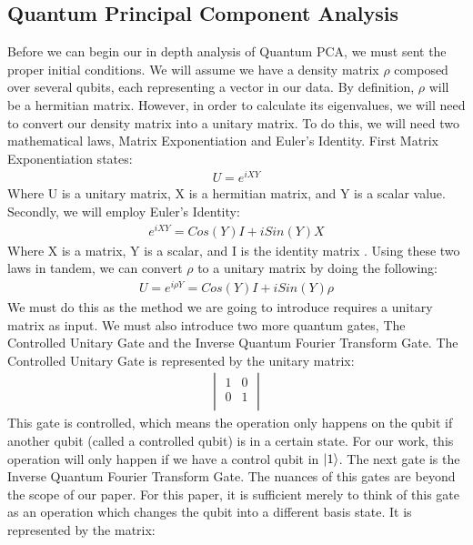 \documentclass[conference]{IEEEtran}
\begin{document}
\subsection{Quantum Principal Component Analysis}
Before we can begin our in depth analysis of Quantum PCA, we must sent the proper initial conditions. We will assume we have a density matrix $\rho$ composed over several qubits, each representing a vector in our data. By definition, $\rho$ will be a hermitian matrix. However, in order to calculate its eigenvalues, we will need to convert our density matrix into a unitary matrix. To do this, we will need two mathematical laws, Matrix Exponentiation and Euler's Identity. First Matrix Exponentiation states:    
\begin{align*}
U = e^{iXY}
\end{align*} 
Where U is a unitary matrix, X is a hermitian matrix, and Y is a scalar value. Secondly, we will employ Euler's Identity: 
\begin{align*}
e^{iXY} = Cos(Y)I + iSin(Y)X
\end{align*} 
Where X is a matrix, Y is a scalar, and I is the identity matrix \cite{b16}. Using these two laws in tandem, we can convert $\rho$ to a unitary matrix by doing the following:
\begin{align*}
 U = e^{i\rho Y} = Cos(Y)I + iSin(Y)\rho
\end{align*} 
We must do this as the method we are going to introduce requires a unitary matrix as input. We must also introduce two more quantum gates, The Controlled Unitary Gate and the Inverse Quantum Fourier Transform Gate. The Controlled Unitary Gate is represented by the unitary matrix: 
 \begin{align*}
    \begin{vmatrix}
    1 & 0 \\
    0 & 1  \\
    \end{vmatrix}
 \end{align*}  
This gate is controlled, which means the operation only happens on the qubit if another qubit (called a controlled qubit) is in a certain state. For our work, this operation will only happen if we have a control qubit in $\ket{1}$.  
\newline
\indent The next gate is the Inverse Quantum Fourier Transform Gate. The nuances of this gates are beyond the scope of our paper. For this paper, it is sufficient merely to think of this gate as an operation which changes the qubit into a different basis state. It is represented by the matrix: 
\end{document}
